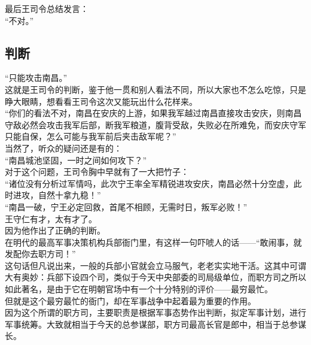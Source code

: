 \begin{multicols}{\theparacolNo}
最后王司令总结发言：\\

“不对。”\\

\subsection{判断}
“只能攻击南昌。”\\

这就是王司令的判断，鉴于他一贯和别人看法不同，所以大家也不怎么吃惊，只是睁大眼睛，想看看王司令这次又能玩出什么花样来。\\

“你们的看法不对，南昌在安庆的上游，如果我军越过南昌直接攻击安庆，则南昌守敌必然会攻击我军后部，断我军粮道，腹背受敌，失败必在所难免，而安庆守军只能自保，怎么可能与我军前后夹击敌军呢？”\\

当然了，听众的疑问还是有的：\\

“南昌城池坚固，一时之间如何攻下？”\\

对于这个问题，王司令胸中早就有了一大把竹子：\\

“诸位没有分析过军情吗，此次宁王率全军精锐进攻安庆，南昌必然十分空虚，此时进攻，自然十拿九稳！”\\

“南昌一破，宁王必定回救，首尾不相顾，无需时日，叛军必败！”\\

王守仁有才，太有才了。\\

因为他作出了正确的判断。\\

在明代的最高军事决策机构兵部衙门里，有这样一句吓唬人的话——“敢闹事，就发配你去职方司！”\\

这句话但凡说出来，一般的兵部小官就会立马服气，老老实实地干活。这其中可谓大有奥妙：兵部下设四个司，类似于今天中央部委的司局级单位，而职方司之所以如此著名，是由于它在明朝官场中有一个十分特别的评价——最穷最忙。\\

但就是这个最穷最忙的衙门，却在军事战争中起着最为重要的作用。\\

因为这个所谓的职方司，主要职责是根据军事态势作出判断，拟定军事计划，进行军事统筹。大致就相当于今天的总参谋部，职方司最高长官是郎中，相当于总参谋长。\\


\end{multicols}
